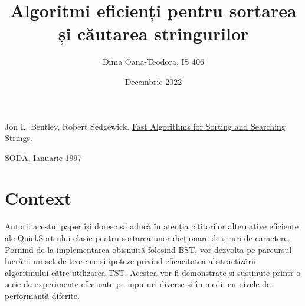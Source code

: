 \documentclass[12pt,a4paper]{article}
\title{Algoritmi eficienți pentru sortarea și căutarea stringurilor}
\author{Dima Oana-Teodora, IS 406}
\date{Decembrie 2022}
\begin{document}
\maketitle

\begin{singlespace} %
Jon L. Bentley, Robert Sedgewick. \href{https://dl.acm.org/doi/pdf/10.5555/314161.314321}{Fast Algorithms for Sorting and Searching Strings}. 
\par
SODA, Ianuarie 1997

\section{Context}
Autorii acestui paper își doresc să aducă în atenția cititorilor alternative eficiente ale QuickSort-ului clasic pentru sortarea unor dicționare de șiruri de caractere. Pornind de la implementarea obișnuită folosind BST, vor dezvolta pe parcursul lucrării un set de teoreme și ipoteze privind eficacitatea abstractizării algoritmului către utilizarea TST. Acestea vor fi demonstrate și susținute printr-o serie de experimente efectuate pe inputuri diverse și în medii cu nivele de performanță diferite. 


\end{singlespace}
\end{document}
